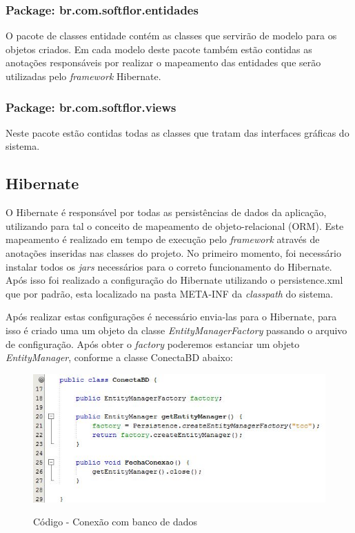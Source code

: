     \subsubsection{Package: br.com.softflor.entidades}  
    O pacote de classes entidade contém as classes que servirão de modelo para os objetos criados. Em cada modelo deste pacote também estão contidas as anotações responsáveis por realizar o mapeamento das entidades que serão utilizadas pelo \textit{framework} Hibernate.
    
    \subsubsection{Package: br.com.softflor.views}  
     Neste pacote estão contidas todas as classes que tratam das interfaces gráficas do sistema. 
    
    \subsection{Hibernate}
    O Hibernate é responsável por todas as persistências de dados da aplicação, utilizando para tal o conceito de mapeamento de objeto-relacional (ORM). Este mapeamento é realizado em tempo de execução pelo \textit{framework} através de anotações inseridas nas classes do projeto. 
    No primeiro momento, foi necessário instalar todos os \textit{jars} necessários para o correto funcionamento do Hibernate. Após isso foi realizado a configuração do Hibernate utilizando o persistence.xml que por padrão, esta localizado na pasta META-INF da \textit{classpath} do sistema. 
    
   Após realizar estas configurações é necessário envia-las para o Hibernate, para isso é criado uma um objeto da classe \textit{EntityManagerFactory }passando o arquivo de configuração. Após obter o \textit{factory} poderemos estanciar um objeto \textit{EntityManager}, conforme a classe ConectaBD abaixo:
   
   
 \begin{figure}[htp]
\centering
\caption{Código - Conexão com banco de dados}
\includegraphics[width=15cm]{imagens/codigo/ConectaBD}
\label{fig:conectaBD}
\end{figure}
   
